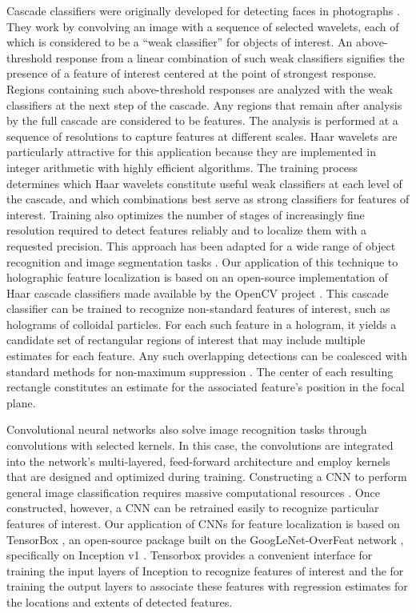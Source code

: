 Cascade classifiers were originally developed for detecting 
faces in photographs \cite{viola2001rapid}. 
They work by convolving an image with a sequence of 
selected wavelets, each of which is considered to be a
``weak classifier'' for objects of interest.
An above-threshold response from a linear combination of such
weak classifiers signifies the presence of a feature of interest
centered at the point of strongest response.
Regions containing such above-threshold responses are analyzed
with the weak classifiers at the next step of the cascade.
Any regions that remain after analysis by the full cascade are
considered to be features.
The analysis is performed at a sequence of resolutions to capture
features at different scales.
Haar wavelets are particularly attractive
for this application because they are implemented in
integer arithmetic with highly efficient algorithms.
The training process determines
which Haar wavelets constitute useful weak classifiers
at each level of the cascade, and which combinations best
serve as strong classifiers for features of interest.
Training also optimizes the number of stages of increasingly
fine resolution required to detect features reliably and to
localize them with a requested precision.
This approach has been adapted for a wide range of
object recognition and image segmentation tasks
\cite{lienhart2002extended}.
Our application of this technique to holographic feature 
localization is based on an open-source implementation
of Haar cascade classifiers made 
available by the OpenCV project \cite{itseez2015opencv}.
This cascade classifier can be trained to recognize non-standard
features of interest, such as holograms of colloidal particles.
For each such feature in a hologram, it yields
a candidate set of rectangular regions of interest that
may include multiple estimates for each feature.
Any such overlapping detections can be coalesced with
standard methods for non-maximum suppression
\cite{neubeck06}.
The center of each resulting rectangle constitutes an
estimate for the associated feature's position in the focal plane.

Convolutional neural networks also solve image recognition
tasks through convolutions with selected kernels. In this case,
the convolutions are integrated into the network's
multi-layered, feed-forward architecture 
\cite{sermanet2013overfeat} and employ kernels that are designed
and optimized during training.
Constructing a CNN to perform general image classification 
requires massive computational resources \cite{tensorflow2015-whitepaper}.
Once constructed, however, a CNN can be
retrained easily to recognize particular features of interest.
Our application of CNNs for feature localization is based on 
TensorBox \cite{stewart2015endtoend}, an open-source package 
built on the GoogLeNet-OverFeat network \cite{sermanet2013overfeat},
specifically on Inception v1 \cite{szegedy15}.
Tensorbox provides a convenient interface for training the
input layers of Inception to recognize features of interest
and the for training the output layers to associate these features
with regression estimates for the
locations and extents of detected features.

